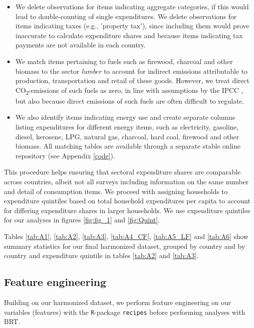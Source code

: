 \documentclass[12pt, a4paper]{article}
\begin{document}
\begin{refsection}
\begin{itemize}
    \item We delete observations for items indicating aggregate categories, if this would lead to double-counting of single expenditures. We delete observations for items indicating taxes (e.g., 'property tax'), since including them would prove inaccurate to calculate expenditure shares and because items indicating tax payments are not available in each country.
    \item We match items pertaining to fuels such as firewood, charcoal and other biomass to the sector \textit{lumber} to account for indirect emissions attributable to production, transportation and retail of these goods. However, we treat direct CO\textsubscript{2}-emissions of such fuels as zero, in line with assumptions by the IPCC \autocite{Grad.2023}, but also because direct emissions of such fuels are often difficult to regulate.
    \item We also identify items indicating energy use and create separate columns listing expenditures for different energy items, such as electricity, gasoline, diesel, kerosene, LPG, natural gas, charcoal, hard coal, firewood and other biomass. All matching tables are available through a separate stable online repository (see Appendix \ref{code}).
\end{itemize}

This procedure helps ensuring that sectoral expenditure shares are comparable across countries, albeit not all surveys including information on the same number and detail of consumption items. We proceed with assigning households to expenditure quintiles based on total household expenditures per capita to account for differing expenditure shares in larger households. We use expenditure quintiles for our analyses in figures \ref{fig:fig_1} and \ref{fig:Quint}.

Tables \ref{tab:A1}, \ref{tab:A2}, \ref{tab:A3}, \ref{tab:A4_CF}, \ref{tab:A5_LF} and \ref{tab:A6} show summary statistics for our final harmonized dataset, grouped by country and by country and expenditure quintile in tables \ref{tab:A2} and \ref{tab:A3}. 


\subsection{Feature engineering} \label{sec:featureengineering}

Building on our harmonized dataset, we perform feature engineering on our variables (features) with the \texttt{R}-package \texttt{recipes} before performing analyses with BRT.


\end{refsection}
\end{document}
